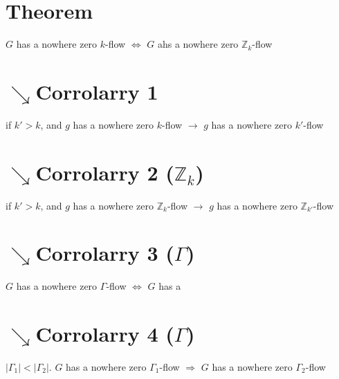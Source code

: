     \section{Theorem}
        $G$ has a nowhere zero $k$-flow $\Leftrightarrow$ $G$ ahs a nowhere zero $\mathbb{Z}_k$-flow
    \section{$\searrow$Corrolarry 1}
                if $k'>k$, and $g$ has a nowhere zero $k$-flow $\rightarrow$ $g$ has a nowhere zero $k'$-flow
    \section{$\searrow$Corrolarry 2 ($\mathbb{Z}_k$)}
        if $k'>k$, and $g$ has a nowhere zero $\mathbb{Z}_k$-flow $\rightarrow$ $g$ has a nowhere zero $\mathbb{Z}_{k'}$-flow
    \section{$\searrow$Corrolarry 3 ($\Gamma$)}
        $G$ has a nowhere zero $\Gamma$-flow $\Leftrightarrow$ $G$ has a 
    \section{$\searrow$Corrolarry 4 ($\Gamma$)}
        $|\Gamma_1|<|\Gamma_2|$. $G$ has a nowhere zero $\Gamma_1$-flow $\Rightarrow$ $G$ has a nowhere zero $\Gamma_2$-flow
